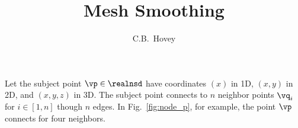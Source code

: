 \documentclass[11pt, oneside]{article}   	%
\title{Mesh Smoothing}
\author{C.B.~Hovey}
\begin{document}
\maketitle


% 
% 
% 
% 


Let the subject point $\vp \in \realnsd$ have coordinates $(x)$ in 1D, 
$(x, y)$ in 2D, and $(x, y, z)$ in 3D.  
The subject point connects to $n$ neighbor points
$\vq_i$ for $i \in [1, n]$ though $n$ edges.  
In Fig.~\ref{fig:node_p}, for example, the point $\vp$ connects for four 
neighbors.
\end{document}
